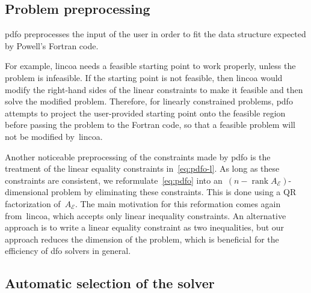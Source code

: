\documentclass[
    smallextended,  %
    final,        %
]{svjour3}
\DeclareMathOperator\rank{rank}
\newcommand{\aeq}{A_{\scriptscriptstyle\mathcal{E}}}
\begin{document}
\subsection{Problem preprocessing}
\label{subsec:pdfo-preprocessing}

\gls{pdfo} preprocesses the input of the user in order to fit the data structure expected by
Powell's Fortran code.

For example, \gls{lincoa} needs a feasible starting point to work properly, unless the problem is
infeasible. If the starting point is not feasible, then \gls{lincoa} would modify the right-hand
sides of the linear constraints to make it feasible and then solve the modified problem.
Therefore, for linearly constrained problems, \gls{pdfo} attempts to project the user-provided
starting point onto the feasible region before passing the problem to the Fortran code, so that
a feasible problem will not be modified by~\gls{lincoa}.

Another noticeable preprocessing of the constraints made by \gls{pdfo} is the treatment of the
linear equality constraints in~\eqref{eq:pdfo-l}.
As long as these constraints are consistent, we reformulate~\eqref{eq:pdfo} into
an~$(n - \rank \aeq)$-dimensional problem by eliminating these constraints.  This is done using a
QR factorization of~$\aeq$. The main motivation for this reformation comes again from~\gls{lincoa},
which accepts only linear inequality constraints. An alternative approach is to write a linear
equality constraint as two inequalities, but our approach reduces the dimension of the problem,
which is beneficial for the efficiency of \gls{dfo} solvers in general.


\subsection{Automatic selection of the solver}
\label{subsec:solver-selection}
\end{document}
